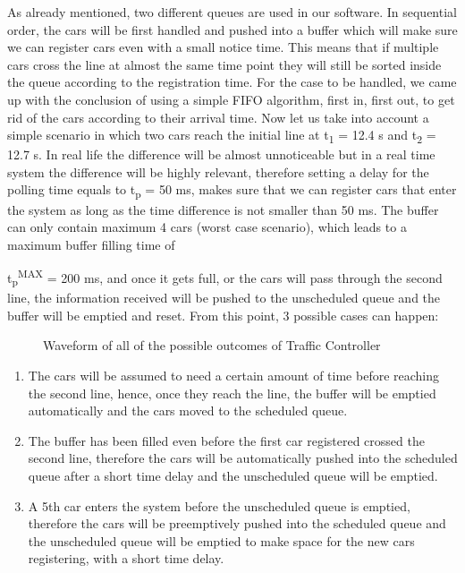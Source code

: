 \documentclass[conference]{IEEEtran}
\begin{document}
As already mentioned, two different queues are used in our software. In sequential order, the cars will be first handled and pushed into a buffer which will make sure we can register cars even with a small notice time. This means that if multiple cars cross the line at almost the same time point they will still be sorted inside the queue according to the registration time. For the case to be handled, we came up with the conclusion of using a simple FIFO algorithm, first in, first out, to get rid of the cars according to their arrival time. Now let us take into account a simple scenario in which two cars reach the initial line at t\textsubscript{1} = 12.4 s and t\textsubscript{2} = 12.7 s. In real life the difference will be almost unnoticeable but in a real time system the difference will be highly relevant, therefore setting a delay for the polling time equals to t\textsubscript{p} = 50 ms, makes sure that we can register cars that enter the system as long as the time difference is not smaller than 50 ms. The buffer can only contain maximum 4 cars (worst case scenario), which leads to a maximum buffer filling time of

t\textsubscript{p}\textsuperscript{MAX} = 200 ms, and once it gets full, or the cars will pass through the second line, the information received will be pushed to the unscheduled queue and the buffer will be emptied and reset. From this point, 3 possible cases can happen:

\begin{figure}[ht]
    \caption{Waveform of all of the possible outcomes of Traffic Controller}
    \label{testbench}
\end{figure}

\begin{enumerate}
\item The cars will be assumed to need a certain amount of time before reaching the second line, hence, once they reach the line, the buffer will be emptied automatically and the cars moved to the scheduled queue.

\item The buffer has been filled even before the first car registered crossed the second line, therefore the cars will be automatically pushed into the scheduled queue after a short time delay and the unscheduled queue will be emptied.

\item A 5th car enters the system before the unscheduled queue is emptied, therefore the cars will be preemptively pushed into the scheduled queue and the unscheduled queue will be emptied to make space for the new cars registering, with a short time delay.
\end{enumerate}
\end{document}
